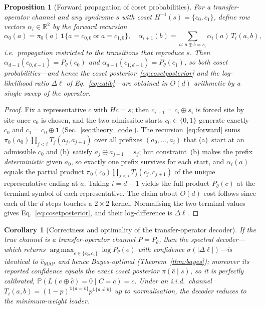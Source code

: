 \documentclass[reprint,aps,prxquantum,amsmath,amssymb,floatfix,nofootinbib,longbibliography]{revtex4-2}
\newtheorem{proposition}{Proposition}
\newtheorem{corollary}{Corollary}
\theoremstyle{definition}
\theoremstyle{remark}
\theoremstyle{plain}
\DeclareMathOperator*{\argmax}{arg\,max}
\newcommand{\R}{\mathbb{R}}
\newcommand{\PP}{\mathbb{P}}
\newcommand{\bone}{\mathbf 1}
\newcommand{\abs}[1]{\left\lvert #1 \right\rvert}
\begin{document}
\begin{proposition}[Forward propagation of coset probabilities]
\label{prop:propagate}
For a transfer-operator channel and any syndrome $s$ with coset
$H^{-1}(s)=\{c_0,c_1\}$, define row vectors $\alpha_i\in\R^{2}$ by the forward
recursion
\begin{equation}
  \alpha_0(a)=\pi_0(a)\,\mathbf 1\{a=c_{0,0}\ \text{or}\ a=c_{1,0}\},\quad
  \alpha_{i+1}(b)=\!\!\sum_{a:\,a\oplus b=s_i}\!\!\alpha_i(a)\,T_i(a,b),
  \label{eq:forward}
\end{equation}
i.e.\ propagation restricted to the transitions that reproduce $s$. Then
$\alpha_{d-1}(c_{0,d-1})=P_\theta(c_0)$ and
$\alpha_{d-1}(c_{1,d-1})=P_\theta(c_1)$, so both coset probabilities---and hence
the coset posterior~\eqref{eq:cosetposterior} and the log-likelihood ratio
$\Delta\ell$ of Eq.~\eqref{eq:calib}---are obtained in $O(d)$ arithmetic by a
single sweep of the operator.
\end{proposition}

\begin{proof}
Fix a representative $c$ with $Hc=s$; then $c_{i+1}=c_i\oplus s_i$ is forced
site by site once $c_0$ is chosen, and the two admissible starts $c_0\in\{0,1\}$
generate exactly $c_0$ and $c_1=c_0\oplus\bone$ (Sec.~\ref{sec:theory_code}).
The recursion~\eqref{eq:forward} sums $\pi_0(a_0)\prod_{j<i}T_j(a_j,a_{j+1})$
over all prefixes $(a_0,\dots,a_i)$ that (a)~start at an admissible $c_{0}$ and
(b)~satisfy $a_j\oplus a_{j+1}=s_j$; but constraint~(b) makes the prefix
\emph{deterministic} given $a_0$, so exactly one prefix survives for each
start, and $\alpha_i(a)$ equals the partial product
$\pi_0(c_0)\prod_{j<i}T_j(c_j,c_{j+1})$ of the unique representative ending at
$a$. Taking $i=d-1$ yields the full product $P_\theta(c)$ at the terminal
symbol of each representative. The claim about $O(d)$ cost follows since each of
the $d$ steps touches a $2\times2$ kernel. Normalising the two terminal values
gives Eq.~\eqref{eq:cosetposterior}, and their log-difference is $\Delta\ell$.
\end{proof}

\begin{corollary}[Correctness and optimality of the transfer-operator decoder]
\label{cor:transferopt}
If the true channel is a transfer-operator channel $P=P_\theta$, then the
spectral decoder---which returns
$\argmax_{e\in\{c_0,c_1\}}\log P_\theta(e)$ with confidence
$\sigma(\abs{\Delta\ell})$---is identical to $\hat c_{\mathrm{MAP}}$ and hence
Bayes-optimal (Theorem~\ref{thm:bayes}); moreover its reported confidence
equals the exact coset posterior $\pi(\hat c\mid s)$, so it is perfectly
calibrated, $\PP(L(e\oplus\hat c)=0\mid C=c)=c$. Under an i.i.d.\ channel
$T_i(a,b)=(1-p)^{\mathbf 1\{a=b\}}p^{\mathbf 1\{a\neq b\}}$ up to
normalisation, the decoder reduces to the minimum-weight leader.
\end{corollary}
\end{document}

